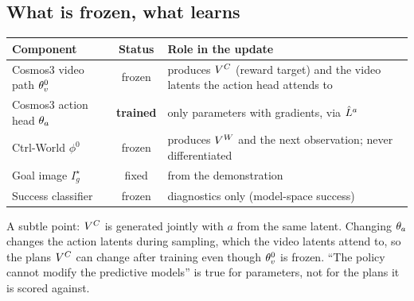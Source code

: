 \subsection{What is frozen, what learns}
\begin{center}
\small
\begin{tabularx}{\linewidth}{@{}l c Y@{}}
\toprule
Component & Status & Role in the update\\
\midrule
Cosmos3 video path $\theta_v^{0}$ & frozen & produces $V^{C}$ (reward target) and the video latents the action head attends to\\
Cosmos3 action head $\theta_a$ & \textbf{trained} & only parameters with gradients, via $\hat L^{a}$\\
Ctrl-World $\phi^0$ & frozen & produces $V^{W}$ and the next observation; never differentiated\\
Goal image $I^\star_g$ & fixed & from the demonstration\\
Success classifier & frozen & diagnostics only (model-space success)\\
\bottomrule
\end{tabularx}
\end{center}
A subtle point: $V^{C}$ is generated jointly with $a$ from the same latent. Changing $\theta_a$ changes the action latents during sampling, which the video latents attend to, so the plans $V^{C}$ can change after training even though $\theta_v^{0}$ is frozen. ``The policy cannot modify the predictive models'' is true for parameters, not for the plans it is scored against.

